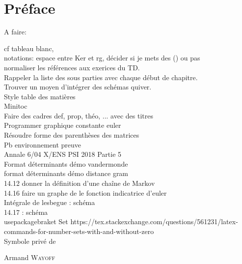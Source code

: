 \pageblanche

\chapter*{Préface}


A faire:

cf tableau blanc, \\
notations: espace entre Ker et rg, décider si je mets des () ou pas \\
normaliser les références aux exerices du TD. \\
Rappeler la liste des sous parties avec chaque début de chapitre. \\
Trouver un moyen d'intégrer des schémas quiver.\\
Style table des matières \\
Minitoc\\
Faire des cadres def, prop, théo, ... avec des titres \\
Programmer graphique constante euler \\
Résoudre forme des parenthèses des matrices \\
Pb environnement preuve \\
Annale 6/04 X/ENS PSI 2018 Partie 5 \\
Format déterminants démo vandermonde \\
format déterminants démo distance gram \\
14.12 donner la définition d'une chaîne de Markov \\
14.16 faire un graphe de le fonction indicatrice d'euler \\
Intégrale de lesbegue : schéma \\
14.17 : schéma \\
usepackage{braket} Set https://tex.stackexchange.com/questions/561231/latex-commands-for-number-sets-with-and-without-zero \\
Symbole privé de 

\begin{flushright}
	Armand \textsc{Wayoff}
\end{flushright}

